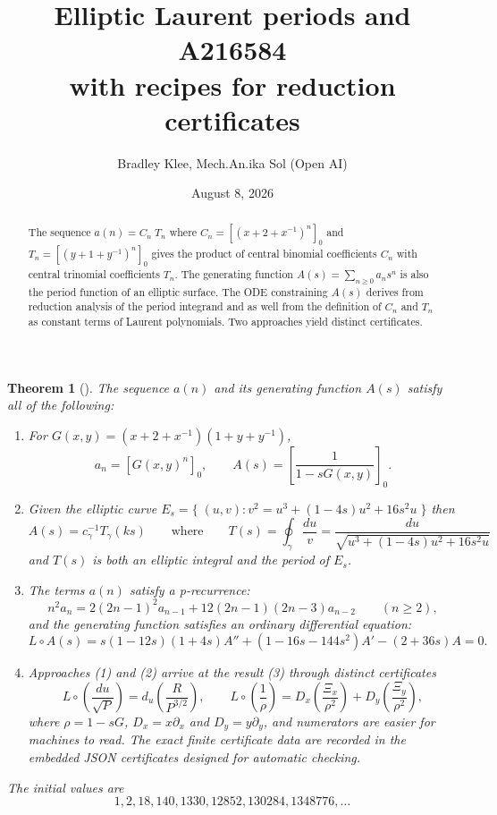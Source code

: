 \documentclass[11pt,fleqn]{article}
\title{\vspace{-2.1em}\textbf{Elliptic Laurent periods and A216584}\\[0.3em]
\large with recipes for reduction certificates}
\author{Bradley Klee, \quad Mech.An.ika Sol (Open AI)}
\date{August 8, 2026}
\theoremstyle{plain}
\newtheorem{theorem}{Theorem}
\begin{document}
\maketitle

\begin{abstract}
The sequence $a(n)=C_n\;T_n$ where $C_n = [(x+2+x^{-1})^n]_0$ and $T_n = [(y+1+y^{-1})^n]_0$  
gives the product of central binomial coefficients $C_n$ with central trinomial coefficients
$T_n$. The generating function $A(s)=\sum_{n\ge0}a_ns^n$ is also the period function of an
elliptic surface. The ODE constraining $A(s)$ derives from reduction analysis of the 
period integrand and as well from the definition of $C_n$ and $T_n$ as constant terms
of Laurent polynomials. Two approaches yield distinct certificates. 
\end{abstract}

\begin{theorem}[]\label{thm:main}
The sequence $a(n)$ and its generating function $A(s)$ satisfy all of the following:
\begin{enumerate}[label=\textnormal{(\arabic*)},leftmargin=2.2em,itemsep=0.22em,topsep=0.2em]
\item For $G(x,y)=(x+2+x^{-1})(1+y+y^{-1})$,
\[
 a_n=[G(x,y)^n]_0,\qquad
 A(s)=\left[\frac{1}{1-sG(x,y)}\right]_0.
\]

\item Given the elliptic curve $E_s= \{ \; (u,v) : v^2=u^3+(1-4s)u^2+16s^2u \; \}$ then 
\[
 A(s)=c_\gamma^{-1} T_\gamma(k s) \qquad \text{where} \qquad 
 T(s) = \oint_{\gamma} \frac{du}{v} = \frac{du}{\sqrt{u^3+(1-4s)u^2+16s^2u}}
\]
and $T(s)$ is both an elliptic integral and the period of $E_s$. 

\item The terms $a(n)$ satisfy a p-recurrence: 
\[
 n^2a_n=2(2n-1)^2a_{n-1}
       +12(2n-1)(2n-3)a_{n-2}\qquad(n\ge2),
\]
and the generating function satisfies an ordinary differential equation: 
\[
L \circ A(s) =  s(1-12s)(1+4s)A''+(1-16s-144s^2)A'-(2+36s)A=0.
\]

\item Approaches (1) and (2) arrive at the result (3) through distinct certificates
\[
 L\circ \!\left(\frac{du}{\sqrt P}\right)
   =d_u\!\left(\frac{R}{P^{3/2}}\right),\qquad
 L\circ \!\left(\frac1\rho\right)
   =D_x\!\left(\frac{\Xi_x}{\rho^2}\right)
    +D_y\!\left(\frac{\Xi_y}{\rho^2}\right),
\]
where $\rho = 1-sG$, $D_x=x\partial_x$ and $D_y=y\partial_y$, and numerators are 
easier for machines to read. The exact finite certificate data are recorded in the 
embedded JSON certificates designed for automatic checking.
\end{enumerate}
The initial values are
\[
1,2,18,140,1330,12852,130284,1348776,\ldots
\]
\end{theorem}
\end{document}
